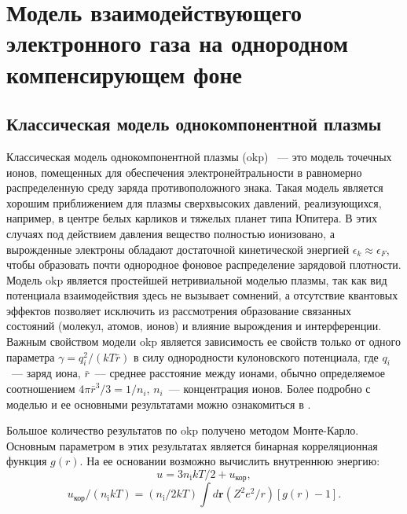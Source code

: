 
\chapter{Модель взаимодействующего электронного газа на однородном компенсирующем фоне}

\section{Классическая модель однокомпонентной плазмы}
Классическая модель однокомпонентной плазмы (\acrshort{okp}) ~--- это модель точечных ионов, помещенных для обеспечения электронейтральности в равномерно распределенную среду заряда противоположного знака.
Такая модель является хорошим приближением для плазмы сверхвысоких давлений, реализующихся, например, в центре белых карликов и тяжелых планет типа Юпитера.
В этих случаях под действием давления вещество полностью ионизовано, а вырожденные электроны обладают достаточной кинетической энергией $\epsilon_k \approx \epsilon_F$, чтобы образовать почти однородное фоновое распределение зарядовой плотности.
Модель \acrshort{okp} является простейшей нетривиальной моделью плазмы, так как вид потенциала взаимодействия здесь не вызывает сомнений, а отсутствие квантовых эффектов позволяет исключить из рассмотрения образование связанных состояний (молекул, атомов, ионов) и влияние вырождения и интерференции. Важным свойством модели \acrshort{okp} является зависимость ее свойств только от одного параметра $\gamma = q_i^2/(kT\bar{r})$ в силу однородности кулоновского потенциала, где $q_i$~--- заряд иона, $\bar{r}$~--- среднее расстояние между ионами, обычно определяемое соотношением $4\pi\bar{r}^3/3 = 1/n_i$, $n_i$~--- концентрация ионов.  Более подробно с моделью и ее основными результатами можно ознакомиться в \cite{Fortov:neid_plasma}.

Большое количество результатов по \acrshort{okp} получено методом Монте-Карло.
Основным параметром в этих результатах является бинарная корреляционная функция $g(r)$.
На ее основании возможно вычислить внутреннюю энергию:
\begin{equation}
    \label{eq:internal_energy_g}
    u=3 n_{\mathrm{i}} k T / 2+u_{\text{кор}},
\end{equation}
\begin{equation}
    \label{eq:u_corr_g}
    u_{\text{кор}} /\left(n_{\mathrm{i}} k T\right)=\left(n_{\mathrm{i}} / 2 k T\right) \int d \mathbf{r}\left(Z^{2} e^{2} / r\right)[g(r)-1].
\end{equation}

